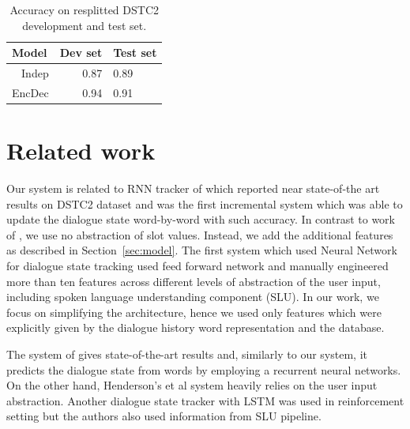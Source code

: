 \documentclass{itatnew}
\def\todo#1{\textcolor{purple}{todo: \textit{#1}}}
\begin{document}
\begin{table}
\caption{Accuracy on resplitted DSTC2 development and test set.}
\begin{center}
\begin{tabular}{r@{\quad}rll}
\hline
\multicolumn{1}{l}{\rule{0pt}{12pt}
                   Model}&\multicolumn{1}{l}{Dev set}&\multicolumn{2}{l}{Test set}\\[2pt]
\hline\rule{0pt}{12pt}
Indep  &   0.87 & 0.89 \\
EncDec &   0.94 & 0.91 \\
\hline
\end{tabular}
\end{center}
\label{tab:resplit}
\end{table}

\section{Related work}
\label{sec:related}
Our system is related to RNN tracker of \cite{zilka2015incremental}
which reported near state-of-the art results on DSTC2 dataset and was the first incremental system which was able to update the dialogue state word-by-word with such accuracy.
In contrast to work of \cite{zilka2015incremental}, we use no abstraction of slot values. Instead, we add the additional features as described in Section~\ref{sec:model}.
The first system which used Neural Network for dialogue state tracking \cite{henderson2013deep} used feed forward network and manually engineered more than ten features across different levels of abstraction of the user input, including spoken language understanding component (SLU).
In our work, we focus on simplifying the architecture, hence we used only features which were explicitly given by the dialogue history word representation and the database.

The system of \cite{henderson2014word} gives state-of-the-art results and, similarly to our system, it predicts the dialogue state from words by employing a recurrent neural networks.
On the other hand, Henderson's et al system heavily relies on the user input abstraction.
Another dialogue state tracker with LSTM was used in reinforcement setting but the authors also used information from SLU pipeline.\cite{lee2016dialog}
\end{document}
